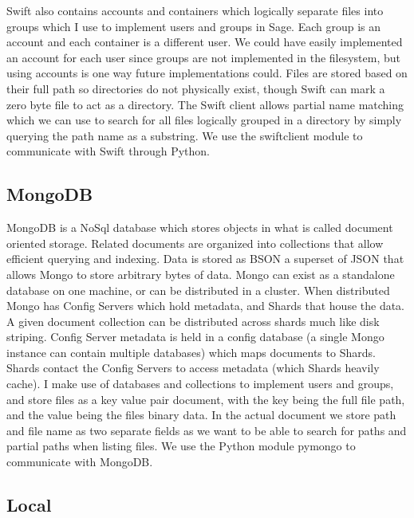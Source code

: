 Swift also contains accounts and containers which logically separate files
into groups which I use to implement users and groups in Sage. Each group is
an account and each container is a different user. We could have easily
implemented an account for each user since groups are not implemented in the
filesystem, but using accounts is one way future implementations could. Files
are stored based on their full path so directories do not physically exist,
though Swift can mark a zero byte file to act as a directory. The Swift client
allows partial name matching which we can use to search for all files
logically grouped in a directory by simply querying the path name as a
substring. We use the swiftclient module to communicate with Swift through
Python.



\subsection{MongoDB}

MongoDB is a NoSql database which stores objects in what is called document
oriented storage. Related documents are organized into collections that allow
efficient querying and indexing. Data is stored as BSON a superset of JSON
that allows Mongo to store arbitrary bytes of data. Mongo can exist as a
standalone database on one machine, or can be distributed in a cluster. When
distributed Mongo has Config Servers which hold metadata, and Shards that
house the data. A given document collection can be distributed across shards
much like disk striping. Config Server metadata is held in a config database
(a single Mongo instance can contain multiple databases) which maps documents
to Shards. Shards contact the Config Servers to access metadata (which Shards
heavily cache). I make use of databases and collections to implement users and
groups, and store files as a key value pair document, with the key being the
full file path, and the value being the files binary data. In the actual
document we store path and file name as two separate fields as we want to be
able to search for paths and partial paths when listing files. We use the
Python module pymongo to communicate with MongoDB.



\subsection{Local}

